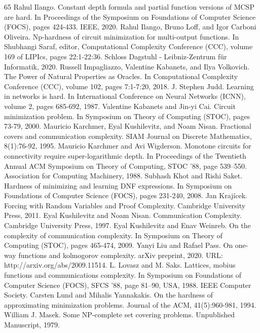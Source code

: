\begin{thebibliography}{65}
 Rahul Ilango. Constant depth formula and partial function versions of MCSP are hard. In Proceedings of the Symposium on Foundations of Computer Science (FOCS), pages 424-433. IEEE, 2020.
 Rahul Ilango, Bruno Loff, and Igor Carboni Oliveira. Np-hardness of circuit minimization for multi-output functions. In Shubhangi Saraf, editor, Computational Complexity Conference (CCC), volume 169 of LIPIcs, pages 22:1-22:36. Schloss Dagstuhl - Leibniz-Zentrum für Informatik, 2020.
 Russell Impagliazzo, Valentine Kabanets, and Ilya Volkovich. The Power of Natural Properties as Oracles. In Computational Complexity Conference (CCC), volume 102, pages 7:1-7:20, 2018.
 J. Stephen Judd. Learning in networks is hard. In International Conference on Neural Networks (ICNN), volume 2, pages 685-692, 1987.
 Valentine Kabanets and Jin-yi Cai. Circuit minimization problem. In Symposium on Theory of Computing (STOC), pages 73-79, 2000.
 Mauricio Karchmer, Eyal Kushilevitz, and Noam Nisan. Fractional covers and communication complexity. SIAM Journal on Discrete Mathematics, 8(1):76-92, 1995.
 Mauricio Karchmer and Avi Wigderson. Monotone circuits for connectivity require super-logarithmic depth. In Proceedings of the Twentieth Annual ACM Symposium on Theory of Computing, STOC '88, page 539–550. Association for Computing Machinery, 1988.
 Subhash Khot and Rishi Saket. Hardness of minimizing and learning DNF expressions. In Symposium on Foundations of Computer Science (FOCS), pages 231-240, 2008.
 Jan Krajícek. Forcing with Random Variables and Proof Complexity. Cambridge University Press, 2011.
 Eyal Kushilevitz and Noam Nisan. Communication Complexity. Cambridge University Press, 1997.
 Eyal Kushilevitz and Enav Weinreb. On the complexity of communication complexity. In Symposium on Theory of Computing (STOC), pages 465-474, 2009.
 Yanyi Liu and Rafael Pass. On one-way functions and kolmogorov complexity. arXiv preprint, 2020. URL: http://arxiv.org/abs/2009.11514.
 L. Lovasz and M. Saks. Lattices, mobius functions and communications complexity. In Symposium on Foundations of Computer Science (FOCS), SFCS '88, page 81–90, USA, 1988. IEEE Computer Society.
 Carsten Lund and Mihalis Yannakakis. On the hardness of approximating minimization problems. Journal of the ACM, 41(5):960-981, 1994.
 William J. Masek. Some NP-complete set covering problems. Unpublished Manuscript, 1979.

\end{thebibliography}
